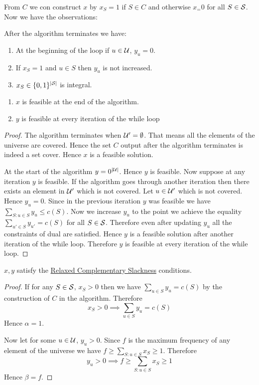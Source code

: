 From $C$ we con construct $x$ by $x_S=1$ if $S\in C$ and otherwise $x_=0$ for all $S\in\mathcal{S}$. Now we have the observations:
\begin{observation*}After the algorithm terminates we have:
    \begin{enumerate}
        \item At the beginning of the loop if $u\in\mathcal{U}$, $y_u=0$.
        \item If $x_S=1$ and $u\in S$ then $y_u$ is not increased.
        \item $x_S\in\{0,1\}^{|\mathcal{S}|}$ is integral.
    \end{enumerate}
\end{observation*}
\begin{lemma}{}{}
    \begin{enumerate}
        \item $x$ is feasible at the end of the algorithm.
        \item $y$ is feasible at every iteration of the while loop
    \end{enumerate}
\end{lemma}
\begin{proof}
    The algorithm terminates when $\mathcal{U}'=\emptyset$. That means all the elements of the universe are covered. Hence the set $C$ output after the algorithm terminates is indeed a set cover. Hence $x$ is a feasible solution.

    At the start of the algorithm $y=0^{|\mathcal{U}|}$. Hence $y$ is feasible. Now suppose at any iteration $y$ is feasible. If the algorithm goes through another iteration then there exists an element in $\mathcal{U}'$ which is not covered. Let $u\in\mathcal{U}'$ which is not covered. Hence $y_u=0$. Since in the previous iteration $y$ was feasible we have $\sum\limits_{S:u\in S}y_u\leq c(S)$. Now we increase $y_u$ to the point we achieve the equality $\sum\limits_{u'\in S}y_{u'}=c(S)$ for all $S\in\mathcal{S}$. Therefore even after updating $y_u$ all the constraints of dual are satisfied. Hence $y$ is a feasible solution after another iteration of the while loop. Therefore $y$ is feasible at every iteration of the while loop.
\end{proof}

\begin{lemma}{}{}
    $x,y$ satisfy the \hyperref[th:relaxed-cs]{Relaxed Complementary Slackness} conditions.
\end{lemma}
\begin{proof}
    If for any $S\in\mathcal{S}$, $x_S>0$ then we have $\sum\limits_{u\in S}y_u=c(S)$ by the construction of $C$ in the algorithm. Therefore $$x_S>0\implies \sum\limits_{u\in S}y_u=c(S)$$Hence $\alpha=1$.

    Now let for some $u\in\mathcal{U}$, $y_u>0$. Since $f$ is the maximum frequency of any element of the universe we have $f\geq \sum\limits_{S:u\in S}x_S\geq 1$. Therefore $$y_u>0\implies f\geq \sum\limits_{S:u\in S}x_S\geq 1$$Hence $\beta=f$. 
\end{proof}

